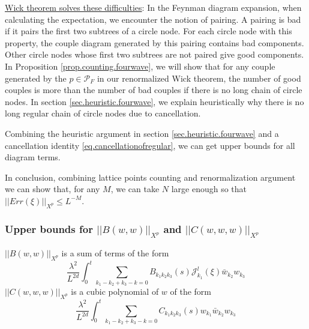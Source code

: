 \underline{Wick theorem solves these difficulties}: In the Feynman diagram expansion, when calculating the expectation, we encounter the notion of pairing. A pairing is bad if it pairs the first two subtrees of a circle node. For each circle node with this property, the couple diagram generated by this pairing contains bad components. Other circle nodes whose first two subtrees are not paired give good components. In Proposition \ref{prop.counting.fourwave}, we will show that for any couple generated by the $p\in \mathcal{P}_F$ in our renormalized Wick theorem, the number of good couples is more than the number of bad couples if there is no long chain of circle nodes. In section \ref{sec.heuristic.fourwave}, we explain heuristically why there is no long regular chain of circle nodes due to cancellation. 


Combining the heuristic argument in section \ref{sec.heuristic.fourwave} and a cancellation identity \eqref{eq.cancellationofregular}, we can get upper bounds for all diagram terms.

In conclusion, combining lattice points counting and renormalization argument we can show that, for any $M$, we can take $N$ large enough so that $||Err(\xi)||_{X^p}\le L^{-M}$.





\subsubsection{Upper bounds for $||B(w,w)||_{X^p}$ and $||C(w,w,w)||_{X^p}$} $||B(w,w)||_{X^p}$ is a sum of terms of the form
\begin{equation}
 \frac{\lambda^2}{L^{2d}} \int^{t}_0\sum_{k_1-k_2+k_3-k=0} B_{k_1k_2k_3}(s) \mathcal{J}^{l}_{k_1}(\xi)\bar{w}_{k_2}w_{k_3}
\end{equation}
$||C(w,w,w)||_{X^p}$ is a cubic polynomial of $w$ of the form
\begin{equation}
 \frac{\lambda^2}{L^{2d}} \int^{t}_0\sum_{k_1-k_2+k_3-k=0} C_{k_1k_2k_3}(s) w_{k_1}\bar{w}_{k_2}w_{k_3}
\end{equation}

